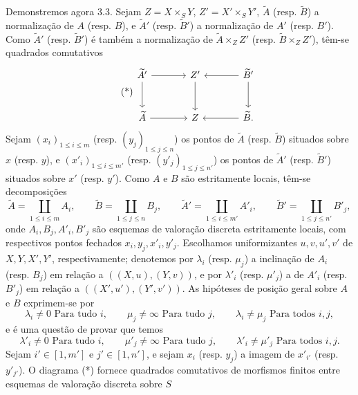 Demonstremos agora 3.3. Sejam $Z=X\times_SY$, $Z'=X'\times_SY'$, $\widetilde A$ (resp. $\widetilde B$) a normalização de $A$ (resp. $B$), e $\widetilde A'$ (resp. $\widetilde B'$) a normalização de $A'$ (resp. $B'$). Como $\widetilde A'$ (resp. $\widetilde B'$) é também a normalização de $\widetilde A\times_ZZ'$ (resp. $\widetilde B\times_ZZ'$), têm-se quadrados comutativos
\begin{equation}
\tag{*}
\begin{tikzcd}[column sep=large,row sep=large]
\widetilde A' \arrow[r] \arrow[d] & Z' \arrow[d] & \widetilde B' \arrow[l] \arrow[d]\\
\widetilde A \arrow[r] & Z & \widetilde B . \arrow[l]
\end{tikzcd}
\end{equation}
Sejam $(x_i)_{1\le i\le m}$ (resp. $(y_j)_{1\le j\le n}$) os pontos de $\widetilde A$ (resp. $\widetilde B$) situados sobre $x$ (resp. $y$), e $(x'_i)_{1\le i\le m'}$ (resp. $(y'_j)_{1\le j\le n'}$) os pontos de $\widetilde A'$ (resp. $\widetilde B'$) situados sobre $x'$ (resp. $y'$). Como $A$ e $B$ são estritamente locais, têm-se decomposições
\[
\widetilde A=\coprod_{1\le i\le m}A_i,\qquad
\widetilde B=\coprod_{1\le j\le n}B_j,\qquad
\widetilde A'=\coprod_{1\le i\le m'}A'_i,\qquad
\widetilde B'=\coprod_{1\le j\le n'}B'_j,
\]
onde $A_i,B_j,A'_i,B'_j$ são esquemas de valoração discreta estritamente locais, com respectivos pontos fechados $x_i,y_j,x'_i,y'_j$. Escolhamos uniformizantes $u,v,u',v'$ de $X,Y,X',Y'$, respectivamente; denotemos por $\lambda_i$ (resp. $\mu_j$) a inclinação de $A_i$ (resp. $B_j$) em relação a $((X,u),(Y,v))$, e por $\lambda'_i$ (resp. $\mu'_j$) a de $A'_i$ (resp. $B'_j$) em relação a $((X',u'),(Y',v'))$. As hipóteses de posição geral sobre $A$ e $B$ exprimem-se por
\begin{equation}
\lambda_i\ne0\text{ Para tudo }i,\qquad
\mu_j\ne\infty\text{ Para tudo }j,\qquad
\lambda_i\ne\mu_j\text{ Para todos }i,j,
\tag{1}
\end{equation}
e é uma questão de provar que temos
\begin{equation}
\lambda'_i\ne0\text{ Para tudo }i,\qquad
\mu'_j\ne\infty\text{ Para tudo }j,\qquad
\lambda'_i\ne\mu'_j\text{ Para todos }i,j.
\tag{2}
\end{equation}
Sejam $i'\in[1,m']$ e $j'\in[1,n']$, e sejam $x_i$ (resp. $y_j$) a imagem de $x'_{i'}$ (resp. $y'_{j'}$). O diagrama (*) fornece quadrados comutativos de morfismos finitos entre esquemas de valoração discreta sobre $S$

